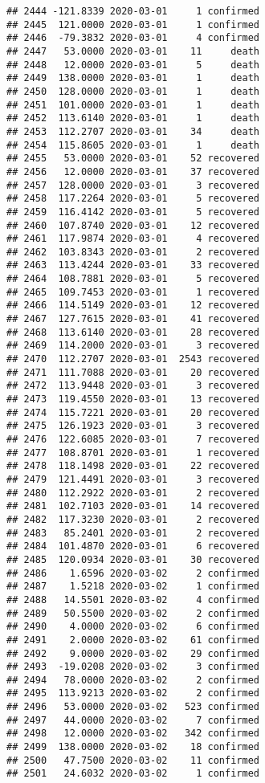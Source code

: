 \documentclass[
]{article}
\begin{document}
\begin{verbatim}
## 2444 -121.8339 2020-03-01     1 confirmed
## 2445  121.0000 2020-03-01     1 confirmed
## 2446  -79.3832 2020-03-01     4 confirmed
## 2447   53.0000 2020-03-01    11     death
## 2448   12.0000 2020-03-01     5     death
## 2449  138.0000 2020-03-01     1     death
## 2450  128.0000 2020-03-01     1     death
## 2451  101.0000 2020-03-01     1     death
## 2452  113.6140 2020-03-01     1     death
## 2453  112.2707 2020-03-01    34     death
## 2454  115.8605 2020-03-01     1     death
## 2455   53.0000 2020-03-01    52 recovered
## 2456   12.0000 2020-03-01    37 recovered
## 2457  128.0000 2020-03-01     3 recovered
## 2458  117.2264 2020-03-01     5 recovered
## 2459  116.4142 2020-03-01     5 recovered
## 2460  107.8740 2020-03-01    12 recovered
## 2461  117.9874 2020-03-01     4 recovered
## 2462  103.8343 2020-03-01     2 recovered
## 2463  113.4244 2020-03-01    33 recovered
## 2464  108.7881 2020-03-01     5 recovered
## 2465  109.7453 2020-03-01     1 recovered
## 2466  114.5149 2020-03-01    12 recovered
## 2467  127.7615 2020-03-01    41 recovered
## 2468  113.6140 2020-03-01    28 recovered
## 2469  114.2000 2020-03-01     3 recovered
## 2470  112.2707 2020-03-01  2543 recovered
## 2471  111.7088 2020-03-01    20 recovered
## 2472  113.9448 2020-03-01     3 recovered
## 2473  119.4550 2020-03-01    13 recovered
## 2474  115.7221 2020-03-01    20 recovered
## 2475  126.1923 2020-03-01     3 recovered
## 2476  122.6085 2020-03-01     7 recovered
## 2477  108.8701 2020-03-01     1 recovered
## 2478  118.1498 2020-03-01    22 recovered
## 2479  121.4491 2020-03-01     3 recovered
## 2480  112.2922 2020-03-01     2 recovered
## 2481  102.7103 2020-03-01    14 recovered
## 2482  117.3230 2020-03-01     2 recovered
## 2483   85.2401 2020-03-01     2 recovered
## 2484  101.4870 2020-03-01     6 recovered
## 2485  120.0934 2020-03-01    30 recovered
## 2486    1.6596 2020-03-02     2 confirmed
## 2487    1.5218 2020-03-02     1 confirmed
## 2488   14.5501 2020-03-02     4 confirmed
## 2489   50.5500 2020-03-02     2 confirmed
## 2490    4.0000 2020-03-02     6 confirmed
## 2491    2.0000 2020-03-02    61 confirmed
## 2492    9.0000 2020-03-02    29 confirmed
## 2493  -19.0208 2020-03-02     3 confirmed
## 2494   78.0000 2020-03-02     2 confirmed
## 2495  113.9213 2020-03-02     2 confirmed
## 2496   53.0000 2020-03-02   523 confirmed
## 2497   44.0000 2020-03-02     7 confirmed
## 2498   12.0000 2020-03-02   342 confirmed
## 2499  138.0000 2020-03-02    18 confirmed
## 2500   47.7500 2020-03-02    11 confirmed
## 2501   24.6032 2020-03-02     1 confirmed

\end{verbatim}
\end{document}
